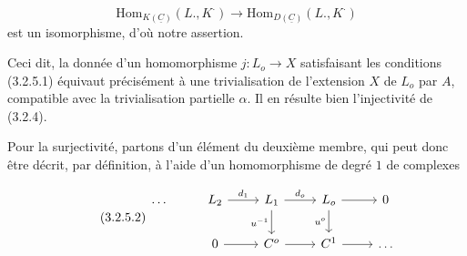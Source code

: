 \begin{equation*}
\mathrm{Hom}_{K(\underline{C})}(L.,K^{\cdot}) \longrightarrow \mathrm{Hom}_{D(\underline{C})}(L.,K^{\cdot})
\end{equation*}
est un isomorphisme, d'où notre assertion.

Ceci dit, la donnée d'un homomorphisme $j : L_o \longrightarrow X$ satisfaisant les conditions (3.2.5.1) équivaut précisément à une trivialisation de l'extension $X$ de $L_o$ par $A$, compatible avec la trivialisation partielle $\alpha$. Il en résulte bien l'injectivité de (3.2.4).

Pour la surjectivité, partons d'un élément du deuxième membre, qui peut donc être décrit, par définition, à l'aide d'un homomorphisme de degré $1$ de complexes

\begin{equation}\tag{3.2.5.2}
\begin{tikzcd}
\ldots & L_2 \arrow[r, "d_1"] & L_1 \arrow[r, "d_o"] \arrow[d, "u^{-1}"'] & L_o \arrow[r] \arrow[d, "u^o"'] & 0 \\
 & 0 \arrow[r] & C^o \arrow[r] & C^1 \arrow[r] & \ldots
\end{tikzcd}
\end{equation}
